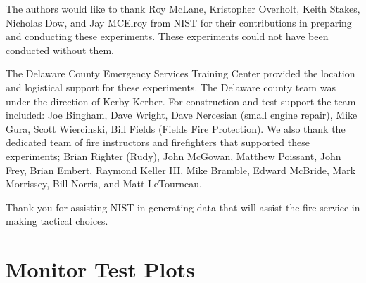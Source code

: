 \documentclass[12pt,oneside]{book}
\begin{document}
The authors would like to thank Roy McLane, Kristopher Overholt, Keith Stakes, Nicholas Dow, and Jay MCElroy from NIST for their contributions in preparing and conducting these experiments. These experiments could not have been conducted without them.  

The Delaware County Emergency Services Training Center provided the location and logistical support for these experiments.  The Delaware county team was under the direction of Kerby Kerber.  For construction and test support the team included: Joe Bingham, Dave Wright, Dave Nercesian (small engine repair), Mike Gura, Scott Wiercinski, Bill Fields (Fields Fire Protection).  We also thank the dedicated team of fire instructors and firefighters that supported these experiments; Brian Righter (Rudy), John McGowan, Matthew Poissant, John Frey, Brian Embert, Raymond Keller III, Mike Bramble, Edward McBride, Mark Morrissey, Bill Norris, and Matt LeTourneau.

Thank you for assisting NIST in generating data that will assist the fire service in making tactical choices.





\appendix
\chapter{Monitor Test Plots}
\label{chap:monitor_plots}
\end{document}
